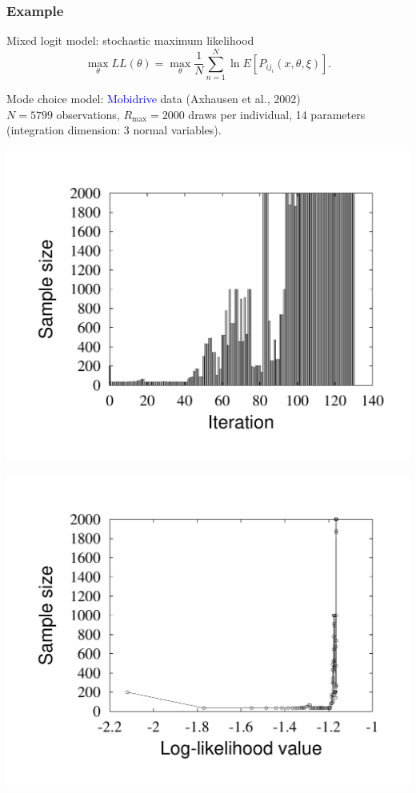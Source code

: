 \documentclass{beamer}
\begin{document}
\begin{frame}[fragile]
\frametitle{Example}

Mixed logit model: stochastic maximum likelihood
\[
\max_{\theta} LL(\theta) =
\max_{\theta} \frac{1}{N} \sum_{n = 1}^{N} \ln E[P_{ij_i}(x,\theta,\xi)].
\]

Mode choice model: \textcolor{blue}{Mobidrive} data (Axhausen et al., 2002)\\
$N = 5799$ observations, $R_{\max} = 2000$ draws per individual, 14 parameters (integration dimension: 3 normal variables).

\begin{center}
\begin{minipage}{0.49\linewidth}
\includegraphics[width=\linewidth]{2000_sample_iter.pdf}
\end{minipage}
\begin{minipage}{0.49\linewidth}
\includegraphics[width=\linewidth]{2000_sample_fct.pdf}

\end{minipage}
\end{center}
\end{frame}
\end{document}
